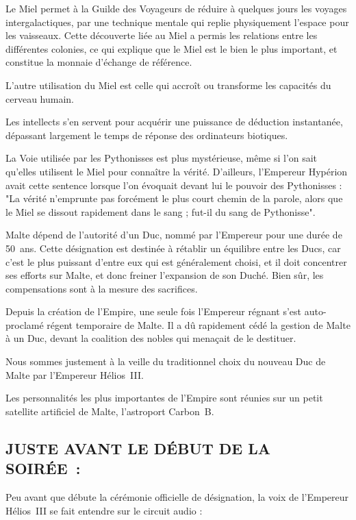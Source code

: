\documentclass[14pt,twocolumn]{extarticle}
\begin{document}
Le Miel permet à la Guilde des Voyageurs de réduire à quelques jours les
voyages intergalactiques, par une technique mentale qui replie physiquement
l'espace pour les vaisseaux. Cette découverte liée au Miel a permis les
relations entre les différentes colonies, ce qui explique que le Miel est le
bien le plus important, et constitue la monnaie d'échange de référence.

L'autre utilisation du Miel est celle qui accroît ou transforme les capacités
du cerveau humain.

Les intellects s'en servent pour acquérir une puissance de déduction
instantanée, dépassant largement le temps de réponse des ordinateurs biotiques.

La Voie utilisée par les Pythonisses est plus mystérieuse, même si l'on sait
qu'elles utilisent le Miel pour connaître la vérité. D'ailleurs, l'Empereur
Hypérion avait cette sentence lorsque l'on évoquait devant lui le pouvoir des
Pythonisses : "La vérité n'emprunte pas forcément le plus court chemin de la
parole, alors que le Miel se dissout rapidement dans le sang ; fut-il du
sang de Pythonisse".

Malte dépend de l'autorité d'un Duc, nommé par l'Empereur pour une durée de
50~ans. Cette désignation est destinée à rétablir un équilibre entre les Ducs,
car c'est le plus puissant d'entre eux qui est généralement choisi, et il doit
concentrer ses efforts sur Malte, et donc freiner l'expansion de son Duché.
Bien sûr, les compensations sont à la mesure des sacrifices.

Depuis la création de l'Empire, une seule fois l'Empereur régnant s'est
auto-proclamé régent temporaire de Malte. Il a dû rapidement cédé la gestion de
Malte à un Duc, devant la coalition des nobles qui menaçait de le destituer.

Nous sommes justement à la veille du traditionnel choix du nouveau Duc de Malte
par l'Empereur Hélios~III.

Les personnalités les plus importantes de l'Empire sont réunies sur un petit
satellite artificiel de Malte, l'astroport Carbon~B.

\subsection{JUSTE AVANT LE DÉBUT DE LA SOIRÉE~:}

Peu avant que débute la cérémonie officielle de désignation, la voix de
l'Empereur Hélios~III se fait entendre sur le circuit audio :
\end{document}
